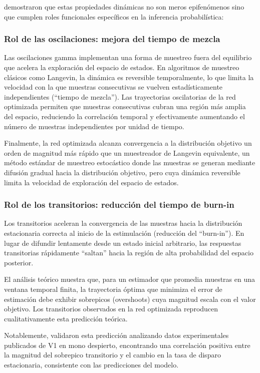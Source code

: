 \citeauthor{echeveste2020cortical} demostraron que estas propiedades dinámicas no son meros epifenómenos sino que cumplen roles funcionales específicos en la inferencia probabilística:

\subsubsection{Rol de las oscilaciones: mejora del tiempo de mezcla}

Las oscilaciones gamma implementan una forma de muestreo fuera del equilibrio que acelera la exploración del espacio de estados. En algoritmos de muestreo clásicos como Langevin, la dinámica es reversible temporalmente, lo que limita la velocidad con la que muestras consecutivas se vuelven estadísticamente independientes (``tiempo de mezcla''). Las trayectorias oscilatorias de la red optimizada permiten que muestras consecutivas cubran una región más amplia del espacio, reduciendo la correlación temporal y efectivamente aumentando el número de muestras independientes por unidad de tiempo.

Finalmente, la red optimizada alcanza convergencia a la distribución objetivo un orden de magnitud más rápido que un muestreador de Langevin equivalente, un método estándar de muestreo estocástico donde las muestras se generan mediante difusión gradual hacia la distribución objetivo, pero cuya dinámica reversible limita la velocidad de exploración del espacio de estados.

\subsubsection{Rol de los transitorios: reducción del tiempo de burn-in}

Los transitorios aceleran la convergencia de las muestras hacia la distribución estacionaria correcta al inicio de la estimulación (reducción del ``burn-in''). En lugar de difundir lentamente desde un estado inicial arbitrario, las respuestas transitorias rápidamente ``saltan'' hacia la región de alta probabilidad del espacio posterior.

El análisis teórico muestra que, para un estimador que promedia muestras en una ventana temporal finita, la trayectoria óptima que minimiza el error de estimación debe exhibir sobrepicos (overshoots) cuya magnitud escala con el valor objetivo. Los transitorios observados en la red optimizada reproducen cualitativamente esta predicción teórica.

Notablemente, \citeauthor{echeveste2020cortical} validaron esta predicción analizando datos experimentales publicados de V1 en mono despierto, encontrando una correlación positiva entre la magnitud del sobrepico transitorio y el cambio en la tasa de disparo estacionaria, consistente con las predicciones del modelo.


